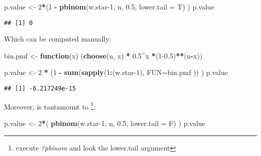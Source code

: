 \documentclass[
]{article}
\newenvironment{Shaded}{\begin{snugshade}}{\end{snugshade}}
\newcommand{\AttributeTok}[1]{\textcolor[rgb]{0.13,0.29,0.53}{#1}}
\newcommand{\ControlFlowTok}[1]{\textcolor[rgb]{0.13,0.29,0.53}{\textbf{#1}}}
\newcommand{\DecValTok}[1]{\textcolor[rgb]{0.00,0.00,0.81}{#1}}
\newcommand{\FloatTok}[1]{\textcolor[rgb]{0.00,0.00,0.81}{#1}}
\newcommand{\FunctionTok}[1]{\textcolor[rgb]{0.13,0.29,0.53}{\textbf{#1}}}
\newcommand{\NormalTok}[1]{#1}
\newcommand{\OtherTok}[1]{\textcolor[rgb]{0.56,0.35,0.01}{#1}}
\newcommand{\SpecialCharTok}[1]{\textcolor[rgb]{0.81,0.36,0.00}{\textbf{#1}}}
\begin{document}
\begin{Shaded}
\begin{Highlighting}[]
\NormalTok{p.value }\OtherTok{\textless{}{-}} \DecValTok{2}\SpecialCharTok{*}\NormalTok{(}\DecValTok{1} \SpecialCharTok{{-}} \FunctionTok{pbinom}\NormalTok{(w.star}\DecValTok{{-}1}\NormalTok{, n, }\FloatTok{0.5}\NormalTok{, }\AttributeTok{lower.tail =}\NormalTok{ T) )}
\NormalTok{p.value}
\end{Highlighting}
\end{Shaded}

\begin{verbatim}
## [1] 0
\end{verbatim}

Which can be computed manually:

\begin{Shaded}
\begin{Highlighting}[]
\NormalTok{bin.pmf }\OtherTok{\textless{}{-}} \ControlFlowTok{function}\NormalTok{(x) (}\FunctionTok{choose}\NormalTok{(n, x) }\SpecialCharTok{*} \FloatTok{0.5}\SpecialCharTok{\^{}}\NormalTok{x }\SpecialCharTok{*}\NormalTok{(}\DecValTok{1}\FloatTok{{-}0.5}\NormalTok{)}\SpecialCharTok{**}\NormalTok{(n}\SpecialCharTok{{-}}\NormalTok{x))}

\NormalTok{p.value }\OtherTok{\textless{}{-}} \DecValTok{2} \SpecialCharTok{*}\NormalTok{ (}\DecValTok{1} \SpecialCharTok{{-}} \FunctionTok{sum}\NormalTok{(}\FunctionTok{sapply}\NormalTok{(}\DecValTok{1}\SpecialCharTok{:}\NormalTok{(w.star}\DecValTok{{-}1}\NormalTok{),  }\AttributeTok{FUN=}\NormalTok{bin.pmf ))}
\NormalTok{                )}
\NormalTok{p.value}
\end{Highlighting}
\end{Shaded}

\begin{verbatim}
## [1] -6.217249e-15
\end{verbatim}

Moreover, is tantamount to \footnote{execute \emph{?pbinom} and look the
  lower.tail argument}:

\begin{Shaded}
\begin{Highlighting}[]
\NormalTok{p.value }\OtherTok{\textless{}{-}} \DecValTok{2}\SpecialCharTok{*}\NormalTok{( }\FunctionTok{pbinom}\NormalTok{(w.star}\DecValTok{{-}1}\NormalTok{, n, }\FloatTok{0.5}\NormalTok{, }\AttributeTok{lower.tail =}\NormalTok{ F) )}
\NormalTok{p.value}
\end{Highlighting}
\end{Shaded}
\end{document}

